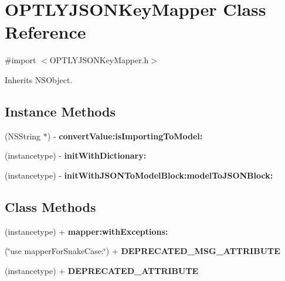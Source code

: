 \hypertarget{interface_o_p_t_l_y_j_s_o_n_key_mapper}{}\section{O\+P\+T\+L\+Y\+J\+S\+O\+N\+Key\+Mapper Class Reference}
\label{interface_o_p_t_l_y_j_s_o_n_key_mapper}


{\ttfamily \#import $<$O\+P\+T\+L\+Y\+J\+S\+O\+N\+Key\+Mapper.\+h$>$}



Inherits N\+S\+Object.

\subsection*{Instance Methods}
\begin{DoxyCompactItemize}
\item 
\mbox{\label{interface_o_p_t_l_y_j_s_o_n_key_mapper_a995d76fd33b85f7d800cfbed54d0aca8}} 
(N\+S\+String $\ast$) -\/ {\bfseries convert\+Value\+:is\+Importing\+To\+Model\+:}
\item 
\mbox{\label{interface_o_p_t_l_y_j_s_o_n_key_mapper_a0729ba84d567670ee5054fafd62d2584}} 
(instancetype) -\/ {\bfseries init\+With\+Dictionary\+:}
\item 
\mbox{\label{interface_o_p_t_l_y_j_s_o_n_key_mapper_a51283e6a8ddccf8b6429e2b5a6b4f827}} 
(instancetype) -\/ {\bfseries init\+With\+J\+S\+O\+N\+To\+Model\+Block\+:model\+To\+J\+S\+O\+N\+Block\+:}
\end{DoxyCompactItemize}
\subsection*{Class Methods}
\begin{DoxyCompactItemize}
\item 
\mbox{\label{interface_o_p_t_l_y_j_s_o_n_key_mapper_a8990b19689598f219968a8a2658e895a}} 
(instancetype) + {\bfseries mapper\+:with\+Exceptions\+:}
\item 
\mbox{\label{interface_o_p_t_l_y_j_s_o_n_key_mapper_aad24c6f6761b9e678e3d89c13642b073}} 
(\char`\"{}use mapper\+For\+Snake\+Case\+:\char`\"{}) + {\bfseries D\+E\+P\+R\+E\+C\+A\+T\+E\+D\+\_\+\+M\+S\+G\+\_\+\+A\+T\+T\+R\+I\+B\+U\+TE}
\item 
\mbox{\label{interface_o_p_t_l_y_j_s_o_n_key_mapper_a936293fe66307db682fe6b4d92123598}} 
(instancetype) + {\bfseries D\+E\+P\+R\+E\+C\+A\+T\+E\+D\+\_\+\+A\+T\+T\+R\+I\+B\+U\+TE}
\end{DoxyCompactItemize}
